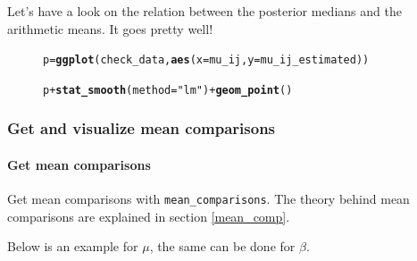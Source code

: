 \documentclass{book}\usepackage[]{graphicx}\usepackage[]{color}
\makeatletter
\newcommand{\hlstr}[1]{\textcolor[rgb]{0.192,0.494,0.8}{#1}}%
\newcommand{\hlopt}[1]{\textcolor[rgb]{0,0,0}{#1}}%
\newcommand{\hlstd}[1]{\textcolor[rgb]{0.345,0.345,0.345}{#1}}%
\newcommand{\hlkwb}[1]{\textcolor[rgb]{0.69,0.353,0.396}{#1}}%
\newcommand{\hlkwc}[1]{\textcolor[rgb]{0.333,0.667,0.333}{#1}}%
\newcommand{\hlkwd}[1]{\textcolor[rgb]{0.737,0.353,0.396}{\textbf{#1}}}%
\newenvironment{kframe}{%
 \def\at@end@of@kframe{}%
 \ifinner\ifhmode%
  \def\at@end@of@kframe{\end{minipage}}%
  \begin{minipage}{\columnwidth}%
 \fi\fi%
 \def\FrameCommand##1{\hskip\@totalleftmargin \hskip-\fboxsep
 \colorbox{shadecolor}{##1}\hskip-\fboxsep
     \hskip-\linewidth \hskip-\@totalleftmargin \hskip\columnwidth}%
 \MakeFramed {\advance\hsize-\width
   \@totalleftmargin\z@ \linewidth\hsize
   \@setminipage}}%
 {\par\unskip\endMakeFramed%
 \at@end@of@kframe}
\newenvironment{knitrout}{}{} %
\makeatother
\begin{document}
Let's have a look on the relation between the posterior medians and the arithmetic means.
It goes pretty well!

\begin{figure}[H]
\begin{knitrout}
\color{fgcolor}\begin{kframe}
\begin{alltt}
\hlstd{p} \hlkwb{=} \hlkwd{ggplot}\hlstd{(check_data,} \hlkwd{aes}\hlstd{(}\hlkwc{x} \hlstd{= mu_ij,} \hlkwc{y} \hlstd{= mu_ij_estimated))}
\end{alltt}


{\ttfamily\noindent\bfseries\color{errorcolor}{\#\# Error in ggplot(check\_data, aes(x = mu\_ij, y = mu\_ij\_estimated)): objet 'check\_data' introuvable}}\begin{alltt}
\hlstd{p} \hlopt{+} \hlkwd{stat_smooth}\hlstd{(}\hlkwc{method} \hlstd{=} \hlstr{"lm"}\hlstd{)} \hlopt{+} \hlkwd{geom_point}\hlstd{()}
\end{alltt}


{\ttfamily\noindent\bfseries\color{errorcolor}{\#\# Error in eval(expr, envir, enclos): objet 'p' introuvable}}\end{kframe}
\end{knitrout}
\end{figure}



\subsubsection{Get and visualize mean comparisons}

\paragraph{Get mean comparisons}

Get mean comparisons with \texttt{mean\_comparisons}.
The theory behind mean comparisons are explained in section \ref{mean_comp}.

Below is an example for $\mu$, the same can be done for $\beta$.
\end{document}
